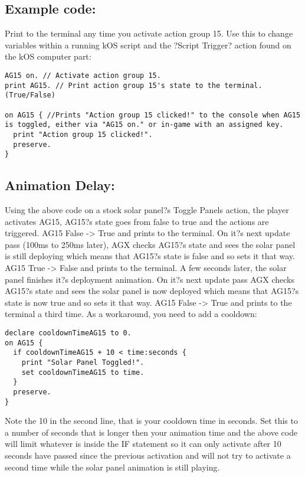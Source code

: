 \subsection{Example code:}

Print to the terminal any time you activate action group 15. Use this to change variables within a running kOS script and the ?Script Trigger? action found on the kOS computer part:

\begin{Verbatim}[frame=single]
AG15 on. // Activate action group 15.
print AG15. // Print action group 15's state to the terminal. (True/False)

on AG15 { //Prints "Action group 15 clicked!" to the console when AG15 is toggled, either via "AG15 on." or in-game with an assigned key.
  print "Action group 15 clicked!".
  preserve.
}
\end{Verbatim}

\subsection{Animation Delay:}

Using the above code on a stock solar panel?s Toggle Panels action, the player activates AG15, AG15?s state goes from false to true and the actions are triggered. AG15 False -> True and prints to the terminal.
On it?s next update pass (100ms to 250ms later), AGX checks AG15?s state and sees the solar panel is still deploying which means that AG15?s state is false and so sets it that way. AG15 True -> False and prints to the terminal.
A few seconds later, the solar panel finishes it?s deployment animation. On it?s next update pass AGX checks AG15?s state and sees the solar panel is now deployed which means that AG15?s state is now true and so sets it that way. AG15 False -> True and prints to the terminal a third time.
As a workaround, you need to add a cooldown:

\begin{Verbatim}[frame=single]
declare cooldownTimeAG15 to 0.
on AG15 {
  if cooldownTimeAG15 + 10 < time:seconds {
    print "Solar Panel Toggled!".
    set cooldownTimeAG15 to time.
  }
  preserve.
}
\end{Verbatim}

Note the 10 in the second line, that is your cooldown time in seconds. Set this to a number of seconds that is longer then your animation time and the above code will limit whatever is inside the IF statement so it can only activate after 10 seconds have passed since the previous activation and will not try to activate a second time while the solar panel animation is still playing.
